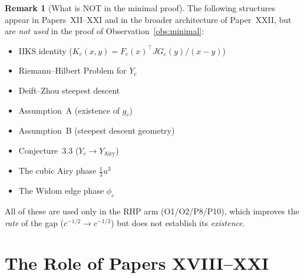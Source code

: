 \documentclass[12pt,a4paper]{amsart}
\theoremstyle{definition}
\newtheorem{remark}[theorem]{Remark}
\begin{document}
\begin{remark}[What is NOT in the minimal proof]
The following structures appear in Papers~XII--XXI and in
the broader architecture of Paper~XXII, but are \emph{not used}
in the proof of Observation~\ref{obs:minimal}:
\begin{itemize}
  \item IIKS identity ($K_c(x,y) = F_c(x)^\top J G_c(y)/(x-y)$)
  \item Riemann--Hilbert Problem for $Y_c$
  \item Deift--Zhou steepest descent
  \item Assumption~A (existence of $g_c$)
  \item Assumption~B (steepest descent geometry)
  \item Conjecture~3.3 ($Y_c \to Y_{\mathrm{Airy}}$)
  \item The cubic Airy phase $\tfrac{1}{3}u^3$
  \item The Widom edge phase $\phi_c$
\end{itemize}
All of these are used only in the RHP arm (O1/O2/P8/P10),
which improves the \emph{rate} of the gap ($c^{-1/2} \to c^{-1/3}$)
but does not establish its \emph{existence}.
\end{remark}

\section{The Role of Papers XVIII--XXI}
\label{sec:role}
\end{document}
